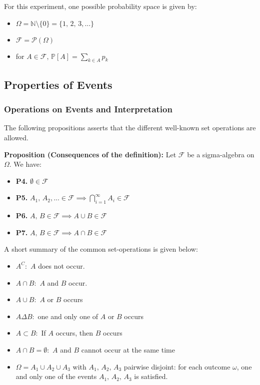 \documentclass[a4paper]{extarticle}
\begin{document}
For this experiment, one possible probability space is given by:

\begin{itemize}
    \item \(\Omega = \mathbb{N} \setminus \{0\} = \{1, \, 2, \, 3,...\}\)
    \item \(\mathcal{F} = \mathcal{P}(\Omega)\)
    \item for \(A \in \mathcal{F}, \, \mathbb{P}[A] = \sum_{k \in A}p_k\)
\end{itemize}

\subsection{Properties of Events}

\subsubsection{Operations on Events and Interpretation}

The following propositions asserts that the different well-known set operations are allowed.

\begin{tbox}
    \textbf{Proposition (Consequences of the definition):} Let \(\mathcal{F}\) be a sigma-algebra on \(\Omega\). We have:

    \begin{itemize}
        \item \textbf{P4.} \(\emptyset \in \mathcal{F}\)
        \item \textbf{P5.} \(A_1, \, A_2,... \in \mathcal{F} \implies \bigcap_{i = 1}^{\infty} A_i \in \mathcal{F}\)
        \item \textbf{P6.} \(A, \, B \in \mathcal{F} \implies A \cup B \in \mathcal{F}\)
        \item \textbf{P7.} \(A, \, B \in \mathcal{F} \implies A \cap B \in \mathcal{F}\)
    \end{itemize}
\end{tbox}

A short summary of the common set-operations is given below:

\begin{itemize}
    \item \(A^C :\) \(A\) does not occur.
    \item \(A \cap B :\) \(A\) and \(B\) occur.
    \item \(A \cup B :\) \(A\) or \(B\) occurs
    \item \(A \Delta B :\) one and only one of \(A\) or \(B\) occurs
    \item \(A \subset B :\) If \(A\) occurs, then \(B\) occurs
    \item \(A \cap B = \emptyset :\) \(A\) and \(B\) cannot occur at the same time
    \item \(\Omega = A_1 \cup A_2 \cup A_3\) with \(A_1, \, A_2, \, A_3\) pairwise disjoint: for each outcome \(\omega\), one and only one of the events \(A_1, \, A_2, \, A_3\) is satisfied.
\end{itemize}
\end{document}
